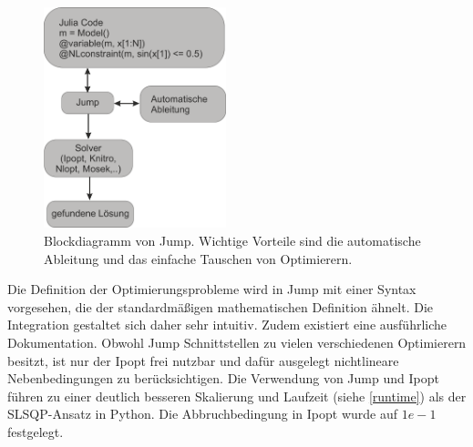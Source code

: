 \documentclass{like}
\begin{document}
\begin{figure}[ht!]
	\centering
	\includegraphics[width=150pt]{Abbildungen/jumpDiagram.png}
	\caption{Blockdiagramm von \ac{Jump}. Wichtige Vorteile sind die automatische Ableitung und das einfache Tauschen von Optimierern.}
	\label{fig:jumpDiagram}
\end{figure}

Die Definition der Optimierungsprobleme wird in Jump mit einer Syntax vorgesehen, die der standardmäßigen mathematischen Definition ähnelt. Die Integration gestaltet sich daher sehr intuitiv.  Zudem existiert eine ausführliche Dokumentation.
Obwohl \ac{Jump} Schnittstellen zu vielen verschiedenen Optimierern besitzt, ist nur der \ac{Ipopt} frei nutzbar und dafür ausgelegt nichtlineare Nebenbedingungen zu berücksichtigen. Die Verwendung von \ac{Jump} und \ac{Ipopt} führen zu einer deutlich besseren Skalierung und Laufzeit (siehe \ref{runtime}) als der \ac{SLSQP}-Ansatz in Python. Die Ab\-bruch\-be\-din\-gung in \ac{Ipopt} wurde auf $1e-1$ festgelegt.
\end{document}
